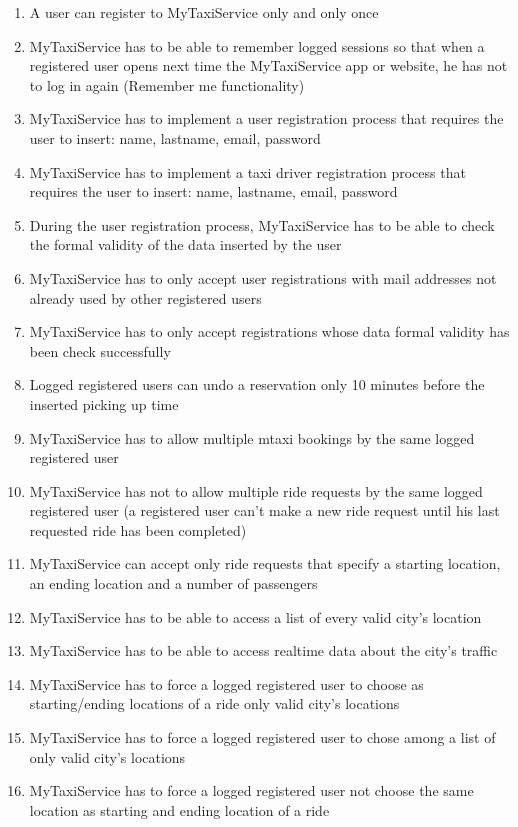 \documentclass[11pt]{article} %
\begin{document}
\begin{enumerate}
	      \item A user can register to MyTaxiService only and only once
	      \item MyTaxiService has to be able to remember logged sessions so that when a registered user
	      opens next time the MyTaxiService app or website, he has not to log in again (Remember me functionality)
	      \item MyTaxiService has to implement a user registration process that requires the user to insert: name, lastname,
	      email, password
	      \item MyTaxiService has to implement a taxi driver registration process that requires the user to insert: name, lastname,
	      email, password
	      \item During the user registration process, MyTaxiService has to be able to check the formal validity of the
	      data inserted by the user
	      \item MyTaxiService has to only accept user registrations with mail addresses not already used by other
	      registered users
	      \item MyTaxiService has to only accept registrations whose data formal validity has been
	      check successfully
	      \item Logged registered users can undo a reservation only 10 minutes before the inserted
	      picking up time
	      \item MyTaxiService has to allow multiple mtaxi bookings by the same logged registered user
	      \item MyTaxiService has not to allow multiple ride requests by the same logged registered user
	      (a registered user can't make a new ride request until his last requested ride has been completed)
	      \item MyTaxiService can accept only ride requests that specify a starting location, an ending location
	      and a number of passengers
	      \item MyTaxiService has to be able to access a list of every valid city's location
	      \item MyTaxiService has to be able to access realtime data about the city's traffic
	      \item MyTaxiService has to force a logged registered user to choose as starting/ending locations of a ride only valid city's locations
	      \item MyTaxiService has to force a logged registered user to chose among a list of only valid city's locations
	      \item MyTaxiService has to force a logged registered user not choose the same location as starting and ending location of a ride

\end{enumerate}
\end{document}
